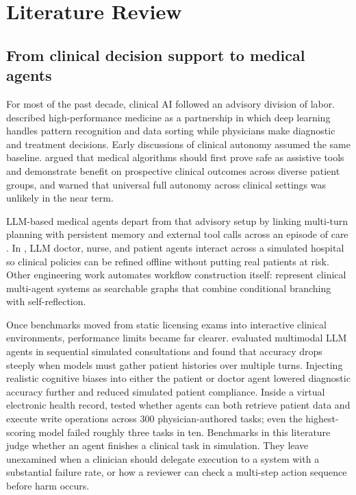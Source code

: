 \section{Literature Review}
\label{sec:litreview}

\subsection{From clinical decision support to medical agents}

For most of the past decade, clinical AI followed an advisory division of labor. \citet{topol2019} described high-performance medicine as a partnership in which deep learning handles pattern recognition and data sorting while physicians make diagnostic and treatment decisions. Early discussions of clinical autonomy assumed the same baseline. \citet{bitterman2020autonomy} argued that medical algorithms should first prove safe as assistive tools and demonstrate benefit on prospective clinical outcomes across diverse patient groups, and warned that universal full autonomy across clinical settings was unlikely in the near term.

LLM-based medical agents depart from that advisory setup by linking multi-turn planning with persistent memory and external tool calls across an episode of care \citep{wang2025baymax}. In \citet{li2024agenthospital}, LLM doctor, nurse, and patient agents interact across a simulated hospital so clinical policies can be refined offline without putting real patients at risk. Other engineering work automates workflow construction itself: \citet{zhuang2025learning} represent clinical multi-agent systems as searchable graphs that combine conditional branching with self-reflection.

Once benchmarks moved from static licensing exams into interactive clinical environments, performance limits became far clearer. \citet{schmidgall2024agentclinic} evaluated multimodal LLM agents in sequential simulated consultations and found that accuracy drops steeply when models must gather patient histories over multiple turns. Injecting realistic cognitive biases into either the patient or doctor agent lowered diagnostic accuracy further and reduced simulated patient compliance. Inside a virtual electronic health record, \citet{jiang2025medagentbench} tested whether agents can both retrieve patient data and execute write operations across 300 physician-authored tasks; even the highest-scoring model failed roughly three tasks in ten. Benchmarks in this literature judge whether an agent finishes a clinical task in simulation. They leave unexamined when a clinician should delegate execution to a system with a substantial failure rate, or how a reviewer can check a multi-step action sequence before harm occurs.

